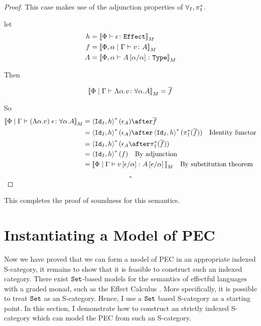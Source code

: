 \documentclass{Report}
\begin{document}
\begin{proof}
This case makes use of the adjunction properties of $\forall_I, \pi_1^*$.

let 
\begin{align}
    h & = {\bf [\![}\Phi \vdash \epsilon \colon \texttt{Effect}{\bf ]\!]}_M
    \\
    f & = {\bf [\![}\Phi,\alpha\mid\Gamma \vdash v \colon A{\bf ]\!]}_M
    \\
    A &= {\bf [\![}\Phi,\alpha \vdash A\left[\alpha / \alpha\right] \colon \texttt{Type}{\bf ]\!]}_M
\end{align}

Then

\begin{equation}
    {\bf [\![}\Phi\mid\Gamma \vdash \Lambda \alpha. v \colon \forall \alpha. A{\bf ]\!]}_M = \overline{f}\\
\end{equation}

So
\begin{align}
    \deno{\gpetyperelation{\eapp{(\elam{\a}{v})}{\e}}{\all{\a}{A}}} & = \pr{\Id{I}}{h}\star(\e_A)\after\bar{f}\\
    & = \pr{\Id{I}}{h}\star(\e_A)\after\pr{\Id{I}}{h}\star(\pstar(\bar{f}))\qt{Identity functor}\\
    &= \pr{\Id{I}}{h}\star(\e_A\after\pstar(\bar{f}))\\
    &= \pr{\Id{I}}{h}\star(f)\qt{By adjunction}\\
    &= \deno{\gpetyperelation{v\ssub{\a}{\e}}{A\ssub{\a}{e}}}\qt{By substitution theorem}\\
\end{align}


$$\square$$

\end{proof}


This completes the proof of soundness for this semantics.

\chapter{Instantiating a Model of PEC}
Now we have proved that we can form a model of PEC in an appropriate indexed S-category, it remains to show that it is feasible to construct such an indexed category. There exist $\texttt{Set}$-based models for the semantics of effectful languages with a graded monad, such as the Effect Calculus . More specifically, it is possible to treat $\texttt{Set}$ as an S-category. Hence, I use a $\texttt{Set}$ based S-category as a starting point. In this section, I  demonstrate how to construct an strictly indexed S-category which can model the PEC from such an S-category.
\end{document}
